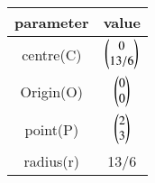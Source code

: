 \begin{tabular}[12pt]{ |c| c|}
    \hline
	parameter & value \\ 
    \hline
	centre(C)  & $\begin{pmatrix}0\\ 13/6\end{pmatrix}$\\
    \hline 
	 Origin(O) &  $\begin{pmatrix}0\\0\end{pmatrix}$\\
    \hline
	 point(P)  &  $\begin{pmatrix}2\\3\end{pmatrix}$\\
    \hline   
         radius(r) & 13/6\\
    \hline
    \end{tabular}

